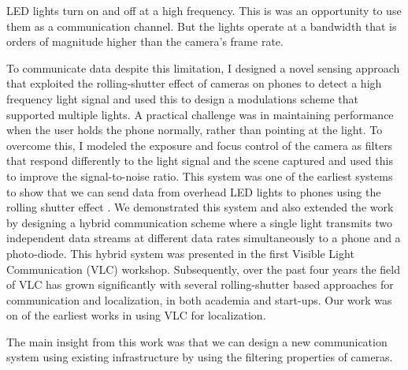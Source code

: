 \documentclass[10pt]{article}
\begin{document}

LED lights turn on and off at a high frequency. This is was an
opportunity to use them as a communication channel. But the lights
operate at a bandwidth that is orders of magnitude higher than the
camera's frame rate.


To communicate data despite this limitation, I designed a novel
sensing approach that exploited the rolling-shutter effect of cameras
on phones to detect a high frequency light signal and used this to
design a modulations scheme that supported multiple lights.  A
practical challenge was in maintaining performance when the user holds
the phone normally, rather than pointing at the light. To overcome
this, I modeled the exposure and focus control of the camera as
filters that respond differently to the light signal and the scene
captured and used this to improve the signal-to-noise ratio. This
system was one of the earliest systems to show that we can send data
from overhead LED lights to phones using the rolling shutter effect
\cite{rajagopal2014visual}.  We demonstrated this system
\cite{rajagopal2014demonstration} and also extended the work
\cite{rajagopal2014hybrid} by designing a hybrid communication scheme
where a single light transmits two independent data streams at
different data rates simultaneously to a phone and a photo-diode. This
hybrid system was presented in the first Visible Light Communication
(VLC) workshop. Subsequently, over the past four years the field of
VLC has grown significantly with several rolling-shutter based
approaches for communication and localization, in both academia and
start-ups. Our work was on of the earliest works in using VLC for
localization.

The main insight from this work was that we can design a new
communication system using existing infrastructure by using the
filtering properties of cameras.


\end{document}

